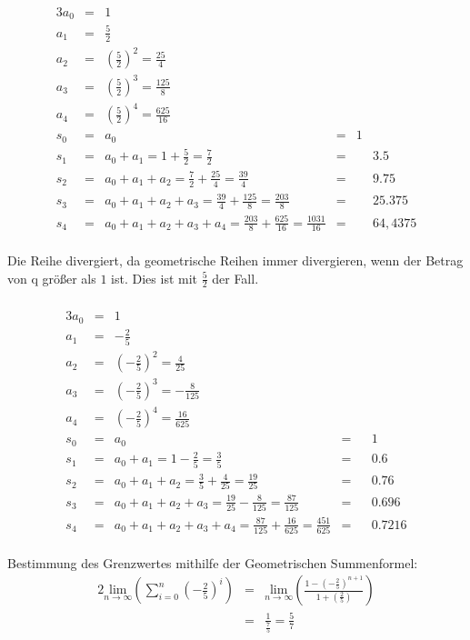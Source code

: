 \documentclass[10pt,a4paper,oneside,ngerman,numbers=noenddot]{scrartcl}
\begin{document}
\subsubsection{} %
\begin{alignat*}{3}
a_{0} &=& 1 &&& \\
a_{1} &=& \frac{5}{2}&&& \\
a_{2} &=& \left(\frac{5}{2}\right)^{2} = \frac{25}{4} &&&\\
a_{3} &=& \left(\frac{5}{2}\right)^{3} = \frac{125}{8} &&& \\
a_{4} &=& \left(\frac{5}{2}\right)^{4} = \frac{625}{16} &&& \\
s_{0} &=& a_{0} &=& 1 \\
s_{1} &=& a_{0} + a_{1} = 1 + \frac{5}{2} = \frac{7}{2} &=&& 3.5 \\
s_{2} &=& a_{0} + a_{1} + a_{2} = \frac{7}{2} + \frac{25}{4} = \frac{39}{4} &=&& 9.75 \\
s_{3} &=& a_{0} + a_{1} + a_{2} + a_{3} = \frac{39}{4} + \frac{125}{8} = \frac{203}{8} &=&& 25.375 \\
s_{4}&=& a_{0} + a_{1} + a_{2} + a_{3} + a_{4} = \frac{203}{8} + \frac{625}{16} = \frac{1031}{16} &=&& 64,4375
\end{alignat*}\\
Die Reihe divergiert, da geometrische Reihen immer divergieren, wenn der Betrag von q größer als $1$ ist. Dies ist mit $\frac{5}{2}$ der Fall.
\subsubsection{} %
\begin{alignat*}{3}
a_{0} &=& 1 &&&\\
a_{1} &=& -\frac{2}{5} &&& \\
a_{2} &=& \left(-\frac{2}{5}\right)^{2} = \frac{4}{25} &&& \\
a_{3} &=& \left(-\frac{2}{5}\right)^{3} = -\frac{8}{125} &&& \\
a_{4} &=& \left(-\frac{2}{5}\right)^{4} = \frac{16}{625} &&& \\
s_{0} &=& a_{0} &=&& 1 \\
s_{1} &=& a_{0} + a_{1} = 1 - \frac{2}{5} = \frac{3}{5} &=&& 0.6 \\
s_{2} &=& a_{0} + a_{1} + a_{2} = \frac{3}{5} + \frac{4}{25} = \frac{19}{25} &=&& 0.76 \\
s_{3} &=& a_{0} + a_{1} + a_{2} + a_{3} = \frac{19}{25} - \frac{8}{125} = \frac{87}{125} &=&& 0.696 \\
s_{4}&=& a_{0} + a_{1} + a_{2} + a_{3} + a_{4} = \frac{87}{125} + \frac{16}{625} = \frac{451}{625} &=&& 0.7216
\end{alignat*} \\
Bestimmung des Grenzwertes mithilfe der Geometrischen Summenformel:\\
\begin{alignat*}{2}
\underset{n \rightarrow \infty}{\text{lim}} \left( \sum\limits_{i=0}^{n} \left(-\frac{2}{5}\right)^{i} \right) &=& \underset{n \rightarrow \infty}{\text{lim}} \left(\frac{1-\left(-\frac{2}{5}\right)^{n+1}}{1+\left(\frac{2}{5}\right)} \right) \\
&=& \frac{1}{\frac{7}{5}} = \frac{5}{7}
\end{alignat*}
\end{document}
